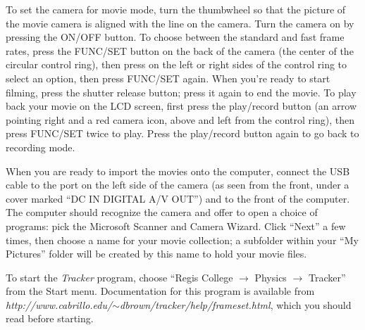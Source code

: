 \documentclass[11pt]{article}
\begin{document}
\bigskip
{}

To set the camera for movie mode, turn the thumbwheel so that the picture of
the movie camera is aligned with the line on the camera.  Turn the camera on
by pressing the ON/OFF button.  To choose between the standard and fast frame
rates, press the FUNC/SET button on the back of the camera (the center of 
the circular control ring), then press on the left or right sides of the 
control ring to select an option, then press FUNC/SET again.  When you're ready 
to start filming, press the shutter release button; press it again to end the 
movie.  To play back your movie on the LCD screen, first press the play/record 
button (an arrow pointing right and a red camera icon, above and left from the 
control ring), then press FUNC/SET twice to play.  Press the play/record button
again to go back to recording mode.

When you are ready to import the movies onto the computer, connect the USB 
cable to the port on the left side of the camera (as seen from the front, 
under a cover marked ``DC IN DIGITAL A/V OUT'') and to the front of the 
computer.  The computer should recognize the camera and offer to open a 
choice of programs: pick the Microsoft Scanner and Camera Wizard. 
Click ``Next'' a few times, then choose a name for your movie collection; a
subfolder within your ``My Pictures'' folder will be created by this name
to hold your movie files.

To start the {\em{Tracker}} program, choose ``Regis College $\rightarrow$
Physics $\rightarrow$ Tracker'' from the Start menu.  Documentation for
this program is available from 
{\em{http://www.cabrillo.edu/$\sim$dbrown/tracker/help/frameset.html}}, which
you should read before starting.
\end{document}
